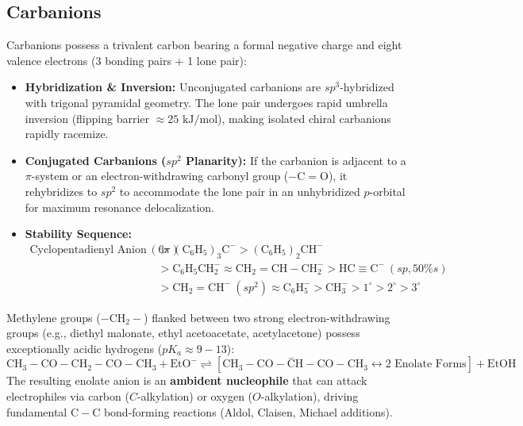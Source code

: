 \documentclass[10pt,a4paper]{article}
\begin{document}
\subsection{Carbanions}

\begin{conceptbox}
Carbanions possess a trivalent carbon bearing a formal negative charge and eight valence electrons (3 bonding pairs $+$ 1 lone pair):
\begin{itemize}
  \item \textbf{Hybridization \& Inversion:} Unconjugated carbanions are $sp^3$-hybridized with trigonal pyramidal geometry. The lone pair undergoes rapid umbrella inversion (flipping barrier $\approx 25\text{ kJ/mol}$), making isolated chiral carbanions rapidly racemize.
  \item \textbf{Conjugated Carbanions ($sp^2$ Planarity):} If the carbanion is adjacent to a $\pi$-system or an electron-withdrawing carbonyl group ($-\mathrm{C=O}$), it rehybridizes to $sp^2$ to accommodate the lone pair in an unhybridized $p$-orbital for maximum resonance delocalization.
  \item \textbf{Stability Sequence:}
  \begin{equation}
    \begin{aligned}
      \text{Cyclopentadienyl Anion } (6\pi) &> \mathrm{(C_6H_5)_3C^-} > \mathrm{(C_6H_5)_2CH^-} \\
      &> \mathrm{C_6H_5CH_2^-} \approx \mathrm{CH_2=CH-CH_2^-} > \mathrm{HC\equiv C^-} \ (sp, 50\% s) \\
      &> \mathrm{CH_2=CH^-} \ (sp^2) \approx \mathrm{C_6H_5^-} > \mathrm{CH_3^-} > 1^\circ > 2^\circ > 3^\circ
    \end{aligned}
  \end{equation}
\end{itemize}
\end{conceptbox}

\begin{usecasebox}
Methylene groups ($-\mathrm{CH_2}-$) flanked between two strong electron-withdrawing groups (e.g., diethyl malonate, ethyl acetoacetate, acetylacetone) possess exceptionally acidic hydrogens ($pK_a \approx 9-13$):
\begin{equation}
  \mathrm{CH_3-CO-CH_2-CO-CH_3} + \mathrm{EtO^-} \rightleftharpoons [\mathrm{CH_3-CO-\overset{-}{C}H-CO-CH_3} \longleftrightarrow \text{2 Enolate Forms}] + \mathrm{EtOH}
\end{equation}
The resulting enolate anion is an \textbf{ambident nucleophile} that can attack electrophiles via carbon ($C$-alkylation) or oxygen ($O$-alkylation), driving fundamental $\mathrm{C-C}$ bond-forming reactions (Aldol, Claisen, Michael additions).
\end{usecasebox}
\end{document}
